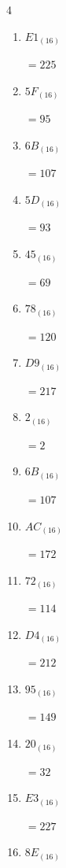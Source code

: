 \begin{multicols}{4}
\begin{enumerate}
        $=11$

  \item $E1_{(16)}$

        $=225$

\columnbreak %

\resetques

  \item $5F_{(16)}$

        $=95$

  \item $6B_{(16)}$

        $=107$

  \item $5D_{(16)}$

        $=93$

  \item $45_{(16)}$

        $=69$

  \item $78_{(16)}$

        $=120$

  \item $D9_{(16)}$

        $=217$

  \item $2_{(16)}$

        $=2$

  \item $6B_{(16)}$

        $=107$

  \item $AC_{(16)}$

        $=172$

  \item $72_{(16)}$

        $=114$

  \item $D4_{(16)}$

        $=212$

  \item $95_{(16)}$

        $=149$

  \item $20_{(16)}$

        $=32$

  \item $E3_{(16)}$

        $=227$

  \item $8E_{(16)}$


\end{enumerate}
\end{multicols}
